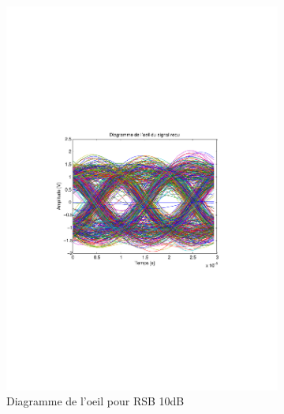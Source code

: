 \documentclass[a4paper,11pt]{article}
\begin{document}
\begin{figure}
	\begin{subfigure}{.5\textwidth}
  		\centering
  		\includegraphics[width=1\linewidth]{Q10-EbNo10.pdf}
  		\caption{Diagramme de l'oeil pour RSB 10dB}
  		\label{fig:q10E10}
	\end{subfigure}
	\begin{subfigure}{.5\textwidth}
  		\centering

\end{subfigure}
\end{figure}
\end{document}
